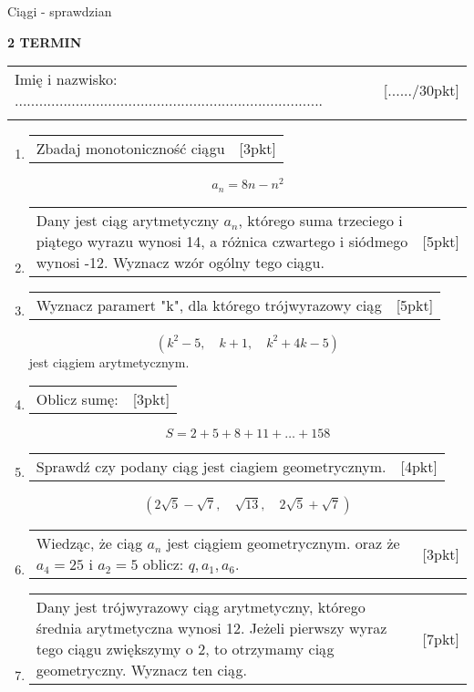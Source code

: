 \documentclass[12pt,a4paper]{article}
\begin{document}
	\begin{center}
		\LARGE Ciągi - sprawdzian
	\end{center}
	\vspace{1.5cm}
	\begin{flushright}
		\textbf{2 TERMIN}
	\end{flushright}
	\begin{tabular}{p{13cm} r}
		Imię i nazwisko: ............................................................................
		&[....../30pkt]\\ 
		\vspace{0.5cm}
	\end{tabular}
	\begin{enumerate}[1.]
		\item  \begin{tabular}{p{13cm} r}
			Zbadaj monotoniczność ciągu  &[3pkt]\\ 
		\end{tabular}
		$$a_n=8n-n^2$$
		
		\item  \begin{tabular}{p{13cm} r}
			Dany jest ciąg arytmetyczny $a_n$, którego suma trzeciego i piątego wyrazu wynosi 14, a różnica czwartego i siódmego wynosi -12. Wyznacz wzór ogólny tego ciągu. 
			&[5pkt]\\ 
		\end{tabular}
		
		\item \begin{tabular}{p{13cm} r}
			Wyznacz paramert "k", dla którego trójwyrazowy ciąg
			&[5pkt]\\
		\end{tabular}
		$$(k^2-5,\quad k+1, \quad k^2+4k-5)$$
		jest ciągiem arytmetycznym. 
		
		\item \begin{tabular}{p{13cm} r}
			Oblicz sumę:&[3pkt]\\
		\end{tabular}
			$$S=2+5+8+11+\dots + 158$$ 
		
		\item \begin{tabular}{p{13cm} r}
			Sprawdź czy podany ciąg jest ciagiem geometrycznym.&[4pkt]\\ 
		\end{tabular}
			$$(2\sqrt{5}-\sqrt{7},\quad \sqrt{13}, \quad 2\sqrt{5}+\sqrt{7})$$
		
		\item \begin{tabular}{p{13cm} r}
			Wiedząc, że ciąg $a_n$ jest ciągiem geometrycznym. oraz że $a_4=25$ i $a_2=5$ oblicz: $q,a_1,a_6$. &[3pkt]\\ 
		\end{tabular}
		
		\item \begin{tabular}{p{13cm} r}
			Dany jest trójwyrazowy ciąg arytmetyczny, którego średnia arytmetyczna wynosi 12. Jeżeli pierwszy wyraz tego ciągu zwiększymy o 2, to otrzymamy ciąg geometryczny. Wyznacz ten ciąg. &[7pkt]\\ 
		\end{tabular}
		
	\end{enumerate}
	

	
\end{document}
